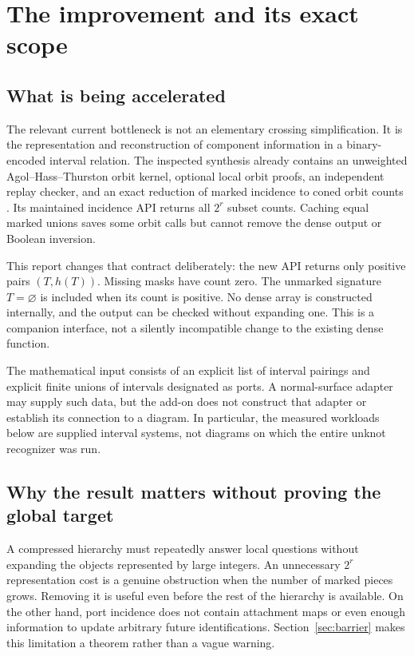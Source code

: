\documentclass[11pt,letterpaper]{article}
\theoremstyle{definition}
\begin{document}
\section{The improvement and its exact scope}\label{sec:scope}

\subsection{What is being accelerated}
The relevant current bottleneck is not an elementary crossing simplification.
It is the representation and reconstruction of component information in a
binary-encoded interval relation. The inspected synthesis already contains an
unweighted Agol--Hass--Thurston orbit kernel, optional local orbit proofs, an
independent replay checker, and an exact reduction of marked incidence to
coned orbit counts \cite{repo-orbits,repo-incidence,repo-certificates}.
Its maintained incidence API returns all $2^r$ subset counts. Caching equal
marked unions saves some orbit calls but cannot remove the dense output or
Boolean inversion.

This report changes that contract deliberately: the new API returns only
positive pairs $(T,h(T))$. Missing masks have count zero. The unmarked
signature $T=\varnothing$ is included when its count is positive. No dense
array is constructed internally, and the output can be checked without
expanding one. This is a companion interface, not a silently incompatible
change to the existing dense function.

The mathematical input consists of an explicit list of interval pairings and
explicit finite unions of intervals designated as ports. A normal-surface
adapter may supply such data, but the add-on does not construct that adapter
or establish its connection to a diagram. In particular, the measured
workloads below are supplied interval systems, not diagrams on which the
entire unknot recognizer was run.

\subsection{Why the result matters without proving the global target}
A compressed hierarchy must repeatedly answer local questions without
expanding the objects represented by large integers. An unnecessary $2^r$
representation cost is a genuine obstruction when the number of marked
pieces grows. Removing it is useful even before the rest of the hierarchy is
available. On the other hand, port incidence does not contain attachment maps
or even enough information to update arbitrary future identifications.
Section~\ref{sec:barrier} makes this limitation a theorem rather than a vague
warning.
\end{document}
